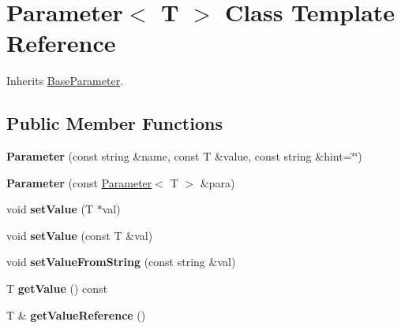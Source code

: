 \hypertarget{classrrp_1_1_parameter}{\section{Parameter$<$ T $>$ Class Template Reference}
\label{classrrp_1_1_parameter}
}


Inherits \hyperlink{classrrp_1_1_base_parameter}{Base\-Parameter}.

\subsection*{Public Member Functions}
\begin{DoxyCompactItemize}
\item 
\hypertarget{classrrp_1_1_parameter_ae82aaae98ce3ed066535b1a79892ab56}{{\bfseries Parameter} (const string \&name, const T \&value, const string \&hint=\char`\"{}\char`\"{})}\label{classrrp_1_1_parameter_ae82aaae98ce3ed066535b1a79892ab56}

\item 
\hypertarget{classrrp_1_1_parameter_a60b959c01d6f1c9a021dd1458b1cd355}{{\bfseries Parameter} (const \hyperlink{classrrp_1_1_parameter}{Parameter}$<$ T $>$ \&para)}\label{classrrp_1_1_parameter_a60b959c01d6f1c9a021dd1458b1cd355}

\item 
\hypertarget{classrrp_1_1_parameter_a9b45e5002f5325f6510c0629f70d461c}{void {\bfseries set\-Value} (T $\ast$val)}\label{classrrp_1_1_parameter_a9b45e5002f5325f6510c0629f70d461c}

\item 
\hypertarget{classrrp_1_1_parameter_abd73037628df6a58777d3cf3376050cf}{void {\bfseries set\-Value} (const T \&val)}\label{classrrp_1_1_parameter_abd73037628df6a58777d3cf3376050cf}

\item 
\hypertarget{classrrp_1_1_parameter_a043aaf39b25ec2830317f22d9075b637}{void {\bfseries set\-Value\-From\-String} (const string \&val)}\label{classrrp_1_1_parameter_a043aaf39b25ec2830317f22d9075b637}

\item 
\hypertarget{classrrp_1_1_parameter_aaae7c6b777ec08981bf41d505a569bbd}{T {\bfseries get\-Value} () const }\label{classrrp_1_1_parameter_aaae7c6b777ec08981bf41d505a569bbd}

\item 
\hypertarget{classrrp_1_1_parameter_a023c97cb9e0745cff7c24697bd4bb2dc}{T \& {\bfseries get\-Value\-Reference} ()}\label{classrrp_1_1_parameter_a023c97cb9e0745cff7c24697bd4bb2dc}


\end{DoxyCompactItemize}
